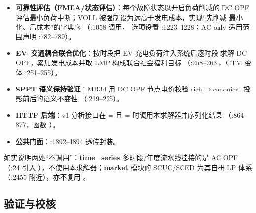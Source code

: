 \begin{itemize}
  \item \textbf{可靠性评估（FMEA/状态评估）}：每个故障状态以开启负荷削减的
        DC OPF 评估最小负荷中断；VOLL 被强制设为远高于发电成本，实现“先削减
        最小化、后成本”的字典序
        （:1058 调用，
        选项设置 :1223--1228；AC-only 适用范围声明 :782--789）。
  \item \textbf{EV--交通耦合联合优化}：按时段把 EV 充电负荷注入系统后逐时段
        求解 DC OPF，累加发电成本并取 LMP 构成联合社会福利目标
        （:258--263；
        CTM 变体 :251--255）。
  \item \textbf{SPPT 语义保持验证}：MR3d 用 DC OPF 节点电价校验
        rich$\to$canonical 投影前后的语义不变性
        （:219--225）。
  \item \textbf{HTTP 后端}：v1 分析接口在 =
        且 = 时调用本求解器并序列化结果
        （:864--877，函数
        ）。
  \item \textbf{公共门面}：:1892--1894 透传封装。
\end{itemize}
如实说明两处“不调用”：\textbf{time\_series} 多时段/年度流水线挂接的是
AC OPF（:24 引入
），不使用本求解器；\textbf{market} 模块的
SCUC/SCED 为其自研 LP 体系（:2455
附近），亦不复用 。

\subsection{验证与校核}

